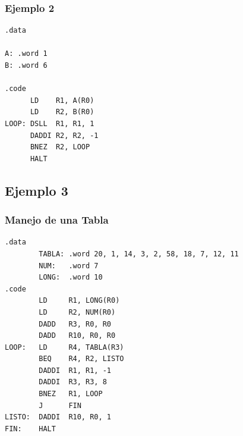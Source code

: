 \documentclass{beamer}
\begin{document}
\begin{frame}[fragile]
\frametitle{Ejemplo 2}
\begin{lstlisting}[language=WinMIPS64,basicstyle=\ttfamily,keywordstyle=\color{blue}]
.data

A: .word 1
B: .word 6

.code
      LD    R1, A(R0)
      LD    R2, B(R0)
LOOP: DSLL  R1, R1, 1
      DADDI R2, R2, -1
      BNEZ  R2, LOOP
      HALT
\end{lstlisting}
\end{frame}

\subsection{Ejemplo 3}
\begin{frame}[fragile]
\frametitle{Manejo de una Tabla}
\tiny{
\begin{lstlisting}[language=WinMIPS64,basicstyle=\ttfamily,keywordstyle=\color{blue}]
.data
        TABLA: .word 20, 1, 14, 3, 2, 58, 18, 7, 12, 11
        NUM:   .word 7
        LONG:  .word 10
.code
        LD     R1, LONG(R0)
        LD     R2, NUM(R0)
        DADD   R3, R0, R0
        DADD   R10, R0, R0
LOOP:   LD     R4, TABLA(R3)
        BEQ    R4, R2, LISTO
        DADDI  R1, R1, -1
        DADDI  R3, R3, 8
        BNEZ   R1, LOOP
        J      FIN
LISTO:  DADDI  R10, R0, 1
FIN:    HALT
\end{lstlisting}
}
\end{frame}
\end{document}
